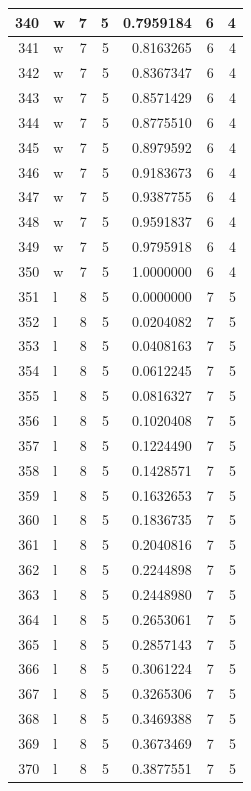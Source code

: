 \documentclass[
  letterpaper,
  DIV=11,
  numbers=noendperiod]{scrreprt}
\begin{document}
\begin{table}
\begin{tabular}[t]{r|l|r|r|r|r|r}
\hline
340 & w & 7 & 5 & 0.7959184 & 6 & 4\\
\hline
341 & w & 7 & 5 & 0.8163265 & 6 & 4\\
\hline
342 & w & 7 & 5 & 0.8367347 & 6 & 4\\
\hline
343 & w & 7 & 5 & 0.8571429 & 6 & 4\\
\hline
344 & w & 7 & 5 & 0.8775510 & 6 & 4\\
\hline
345 & w & 7 & 5 & 0.8979592 & 6 & 4\\
\hline
346 & w & 7 & 5 & 0.9183673 & 6 & 4\\
\hline
347 & w & 7 & 5 & 0.9387755 & 6 & 4\\
\hline
348 & w & 7 & 5 & 0.9591837 & 6 & 4\\
\hline
349 & w & 7 & 5 & 0.9795918 & 6 & 4\\
\hline
350 & w & 7 & 5 & 1.0000000 & 6 & 4\\
\hline
351 & l & 8 & 5 & 0.0000000 & 7 & 5\\
\hline
352 & l & 8 & 5 & 0.0204082 & 7 & 5\\
\hline
353 & l & 8 & 5 & 0.0408163 & 7 & 5\\
\hline
354 & l & 8 & 5 & 0.0612245 & 7 & 5\\
\hline
355 & l & 8 & 5 & 0.0816327 & 7 & 5\\
\hline
356 & l & 8 & 5 & 0.1020408 & 7 & 5\\
\hline
357 & l & 8 & 5 & 0.1224490 & 7 & 5\\
\hline
358 & l & 8 & 5 & 0.1428571 & 7 & 5\\
\hline
359 & l & 8 & 5 & 0.1632653 & 7 & 5\\
\hline
360 & l & 8 & 5 & 0.1836735 & 7 & 5\\
\hline
361 & l & 8 & 5 & 0.2040816 & 7 & 5\\
\hline
362 & l & 8 & 5 & 0.2244898 & 7 & 5\\
\hline
363 & l & 8 & 5 & 0.2448980 & 7 & 5\\
\hline
364 & l & 8 & 5 & 0.2653061 & 7 & 5\\
\hline
365 & l & 8 & 5 & 0.2857143 & 7 & 5\\
\hline
366 & l & 8 & 5 & 0.3061224 & 7 & 5\\
\hline
367 & l & 8 & 5 & 0.3265306 & 7 & 5\\
\hline
368 & l & 8 & 5 & 0.3469388 & 7 & 5\\
\hline
369 & l & 8 & 5 & 0.3673469 & 7 & 5\\
\hline
370 & l & 8 & 5 & 0.3877551 & 7 & 5\\

\end{tabular}
\end{table}
\end{document}

